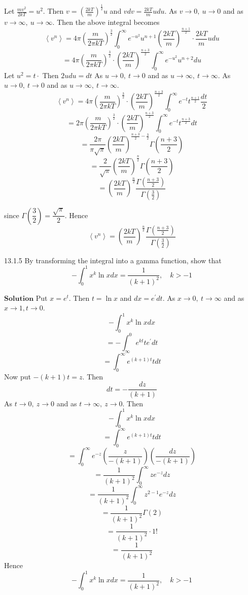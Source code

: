 Let $\frac{m v^{2}}{2 k T}=u^{2} .$ Then $v=\left(\frac{2 k T}{m}\right)^{\frac{1}{2}} u$ and $v d v=\frac{2 k T}{m} u d u$. As $v \rightarrow 0, \  u \rightarrow 0$ and as $v \rightarrow \infty, \  u \rightarrow \infty$. Then the above integral becomes
$$
\left\langle v^{n}\right\rangle=4 \pi\left(\frac{m}{2 \pi k T}\right)^{\frac{3}{2}} \int_{0}^{\infty} e^{-u^{2}} u^{n+1}\left(\frac{2 k T}{m}\right)^{\frac{n+1}{2}} \cdot \frac{2 k T}{m} u d u
$$
$$
=4 \pi\left(\frac{m}{2 \pi k T}\right)^{\frac{3}{2}} \cdot\left(\frac{2 k T}{m}\right)^{\frac{n+3}{2}} \int_{0}^{\infty} e^{-u^{2}} u^{n+2} d u
$$
Let $u^{2}=t \cdot$ Then $2 u d u=d t$ As $u \rightarrow 0, \  t \rightarrow 0$ and as $u \rightarrow \infty, \  t \rightarrow \infty$. As $u \rightarrow 0, \  t \rightarrow 0$ and as $u \rightarrow \infty, \  t \rightarrow \infty$.
$$
\left\langle v^{n}\right\rangle=4 \pi\left(\frac{m}{2 \pi k T}\right)^{\frac{3}{2}} \cdot\left(\frac{2 k T}{m}\right)^{\frac{n+3}{2}} \int_{0}^{\infty} e^{-t} t^{\frac{n+1}{2}} \frac{d t}{2}
$$
$$
=2 \pi\left(\frac{m}{2 \pi k T}\right)^{\frac{3}{2}} \cdot\left(\frac{2 k T}{m}\right)^{\frac{n+3}{2}} \int_{0}^{\infty} e^{-t} t^{\frac{n+3}{2}} d t
$$
$$
=\frac{2 \pi}{\pi \sqrt{\pi}}\left(\frac{2 k T}{m}\right)^{\frac{n+3}{2}-\frac{3}{2}} \Gamma\left(\frac{n+3}{2}\right)
$$
$$
=\frac{2}{\sqrt{\pi}}\left(\frac{2 k T}{m}\right)^{\frac{n}{2}} \Gamma\left(\frac{n+3}{2}\right)
$$
$$
=\left(\frac{2 k T}{m}\right)^{\frac{n}{2}} \frac{\Gamma\left(\frac{n+3}{2}\right)}{\Gamma\left(\frac{3}{2}\right)}
$$


since $\Gamma\left(\dfrac{3}{2}\right)=\dfrac{\sqrt{\pi}}{2}$. Hence 
$$\left\langle v^{n}\right\rangle=\left(\dfrac{2 k T}{m}\right)^{\frac{n}{2}} \frac{\Gamma\left(\frac{n+3}{2}\right)}{\Gamma\left(\frac{3}{2}\right)}$$

\newpage


\begin{mybox}{13.1.5}
By transforming the integral into a gamma function, show that
$$
-\int_{0}^{1} x^{k} \ln x d x=\frac{1}{(k+1)^{2}}, \quad k>-1
$$
\end{mybox}

$\boxed{\textbf{Solution}}$ Put $x=e^{t} .$ Then $t=\ln x$ and $d x=e^{\prime} d t$. As $x \rightarrow 0, \  t \rightarrow \infty$ and as $x \rightarrow 1, t \rightarrow 0$.
$$-\int_{0}^{1} x^{k} \ln x d x$$
$$=-\int_{\infty}^{0} e^{k t} t e^{\prime} d t$$
$$=\int_{0}^{\infty} e^{(k+1) t} t d t$$
Now put $-(k+1) t=z .$ Then 
$$d t=-\frac{d z}{(k+1)} $$
As $t \rightarrow 0, \  z \rightarrow 0$ and as $t \rightarrow \infty, \  z \rightarrow 0$. Then
$$-\int_{0}^{1} x^{k} \ln x d x$$
$$=\int_{0}^{\infty} e^{(k+1) t} t d t$$
$$=\int_{0}^{\infty} e^{-z}\left(\frac{z}{-(k+1)}\right)\left(\frac{d z}{-(k+1)}\right)$$
$$=\frac{1}{(k+1)^{2}} \int_{0}^{\infty} z e^{-z} d z$$
$$=\frac{1}{(k+1)^{2}} \int_{0}^{\infty} z^{2-1} e^{-z} d z$$
$$=\frac{1}{(k+1)^{2}} \Gamma(2)$$
$$=\frac{1}{(k+1)^{2}} \cdot 1 !$$
$$=\frac{1}{(k+1)^{2}}$$
Hence
$$
-\int_{0}^{1} x^{k} \ln x d x=\frac{1}{(k+1)^{2}}, \quad k>-1
$$

